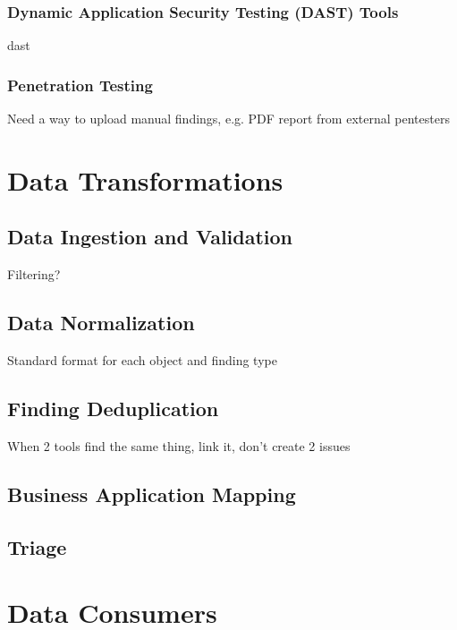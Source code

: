 \subsubsection{Dynamic Application Security Testing (DAST) Tools}

\gls{dast}

\subsubsection{Penetration Testing}

Need a way to upload manual findings, e.g. PDF report from external pentesters



\section{Data Transformations}

\subsection{Data Ingestion and Validation}

Filtering?

\subsection{Data Normalization}

Standard format for each object and finding type

\subsection{Finding Deduplication}

When 2 tools find the same thing, link it, don't create 2 issues

\subsection{Business Application Mapping}

\subsection{Triage}



\section{Data Consumers}

